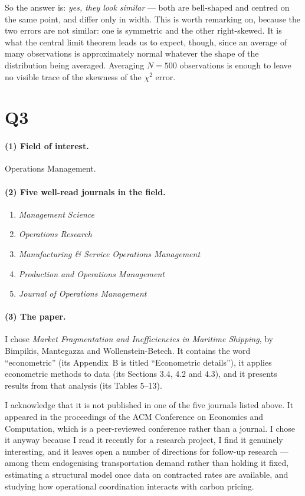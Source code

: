 \documentclass[11pt]{article}
\begin{document}
So the answer is: \emph{yes, they look similar} --- both are bell-shaped and
centred on the same point, and differ only in width. This is worth remarking on,
because the two errors are not similar: one is symmetric and the other
right-skewed. It is what the central limit theorem leads us to expect, though,
since an average of many observations is approximately normal whatever the shape
of the distribution being averaged. Averaging $N = 500$ observations is enough
to leave no visible trace of the skewness of the $\chi^2$ error.

\section{Q3}

\paragraph{(1) Field of interest.}
Operations Management.

\paragraph{(2) Five well-read journals in the field.}
\begin{enumerate}
\item \emph{Management Science}
\item \emph{Operations Research}
\item \emph{Manufacturing \& Service Operations Management}
\item \emph{Production and Operations Management}
\item \emph{Journal of Operations Management}
\end{enumerate}

\paragraph{(3) The paper.}
I chose \emph{Market Fragmentation and Inefficiencies in Maritime Shipping},
by Bimpikis, Mantegazza and Wollenstein-Betech. It contains the word
``econometric'' (its Appendix~B is titled ``Econometric details''), it applies
econometric methods to data (its Sections 3.4, 4.2 and 4.3), and it presents
results from that analysis (its Tables 5--13).

I acknowledge that it is not published in one of the five journals listed
above. It appeared in the proceedings of the ACM Conference on Economics and
Computation, which is a peer-reviewed conference rather than a journal. I chose
it anyway because I read it recently for a research project, I find it genuinely
interesting, and it leaves open a number of directions for follow-up research
--- among them endogenising transportation demand rather than holding it fixed,
estimating a structural model once data on contracted rates are available, and
studying how operational coordination interacts with carbon pricing.
\end{document}
